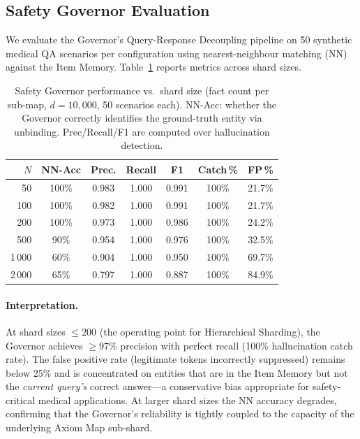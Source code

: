 \documentclass[11pt,a4paper]{article}
\begin{document}
\subsection{Safety Governor Evaluation}
\label{sec:governor_results}

We evaluate the Governor's Query-Response Decoupling pipeline on 50
synthetic medical QA scenarios per configuration using nearest-neighbour
matching (NN) against the Item Memory.  Table~\ref{tab:governor}
reports metrics across shard sizes.

\begin{table}[t]
    \centering
    \caption{Safety Governor performance vs.\ shard size (fact count per
    sub-map, $d = 10{,}000$, 50 scenarios each).  NN-Acc: whether the
    Governor correctly identifies the ground-truth entity via unbinding.
    Prec/Recall/F1 are computed over hallucination detection.}
    \label{tab:governor}
    \begin{tabular}{@{}rcccccc@{}}
        \toprule
        \textbf{$N$} & \textbf{NN-Acc} & \textbf{Prec.}
        & \textbf{Recall} & \textbf{F1}
        & \textbf{Catch\,\%} & \textbf{FP\,\%} \\
        \midrule
        50   & 100\%  & 0.983 & 1.000 & 0.991 & 100\% & 21.7\% \\
        100  & 100\%  & 0.982 & 1.000 & 0.991 & 100\% & 21.7\% \\
        200  & 100\%  & 0.973 & 1.000 & 0.986 & 100\% & 24.2\% \\
        500  &  90\%  & 0.954 & 1.000 & 0.976 & 100\% & 32.5\% \\
        1\,000 & 60\% & 0.904 & 1.000 & 0.950 & 100\% & 69.7\% \\
        2\,000 & 65\% & 0.797 & 1.000 & 0.887 & 100\% & 84.9\% \\
        \bottomrule
    \end{tabular}
\end{table}

\paragraph{Interpretation.}
At shard sizes $\leq 200$ (the operating point for Hierarchical Sharding),
the Governor achieves $\geq 97\%$ precision with perfect recall (100\%
hallucination catch rate).  The false positive rate (legitimate tokens
incorrectly suppressed) remains below 25\% and is concentrated on
entities that are in the Item Memory but not the \emph{current query's}
correct answer---a conservative bias appropriate for safety-critical
medical applications.  At larger shard sizes the NN accuracy degrades,
confirming that the Governor's reliability is tightly coupled to the
capacity of the underlying Axiom Map sub-shard.
\end{document}
